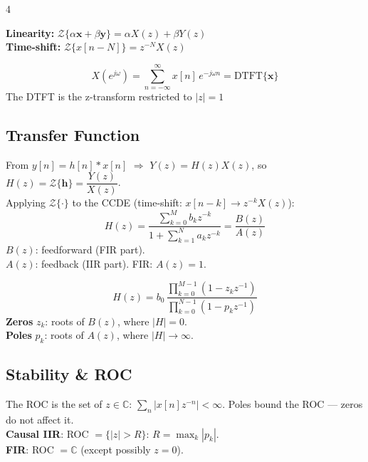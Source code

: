 \documentclass[8pt,a4paper,landscape]{extarticle}
\begin{document}
\begin{multicols*}{4}
\begin{prop}[title=Fundamental properties]
\textbf{Linearity:} $\mathcal{Z}\{\alpha\mathbf{x}+\beta\mathbf{y}\} = \alpha X(z)+\beta Y(z)$\\
\textbf{Time-shift:} $\mathcal{Z}\{x[n-N]\} = z^{-N}X(z)$
\end{prop}

\begin{prop}[title=Link to DTFT]
\[X(e^{j\omega}) = \sum_{n=-\infty}^{\infty} x[n]\,e^{-j\omega n} = \mathrm{DTFT}\{\mathbf{x}\}\]
The DTFT is the z-transform restricted to $|z|=1$
\end{prop}

\subsection{Transfer Function}

\begin{defn}[title=Transfer function $H(z)$]
From $y[n]=h[n]*x[n]$ $\Rightarrow$ $Y(z)=H(z)X(z)$, so $H(z)=\mathcal{Z}\{\mathbf{h}\}=\dfrac{Y(z)}{X(z)}$.\\[4pt]
Applying $\mathcal{Z}\{\cdot\}$ to the CCDE (time-shift: $x[n-k]\to z^{-k}X(z)$):
\[H(z) = \frac{\displaystyle\sum_{k=0}^{M}b_k z^{-k}}{\displaystyle 1+\sum_{k=1}^{N}a_k z^{-k}} = \frac{B(z)}{A(z)}\]
$B(z)$: feedforward (FIR part).\\$A(z)$: feedback (IIR part). FIR: $A(z)=1$.
\end{defn}

\begin{defn}[title=Zeros \& poles — factored form]
\[H(z) = b_0\,\frac{\displaystyle\prod_{k=0}^{M-1}(1-z_k z^{-1})}{\displaystyle\prod_{k=0}^{N-1}(1-p_k z^{-1})}\]
\textbf{Zeros} $z_k$: roots of $B(z)$, where $|H|=0$.\\
\textbf{Poles} $p_k$: roots of $A(z)$, where $|H|\to\infty$.
\end{defn}

\subsection{Stability \& ROC}

\begin{prop}[title=ROC \& causality]
The ROC is the set of $z\in\mathbb{C}$: $\sum_n|x[n]z^{-n}|<\infty$.
Poles bound the ROC — zeros do not affect it.\\[2pt]
\textbf{Causal IIR}: ROC $= \{|z|>R\}$: $R=\max_k|p_k|$.\\
\textbf{FIR}: ROC $= \mathbb{C}$ (except possibly $z=0$).
\end{prop}


\end{multicols*}
\end{document}
